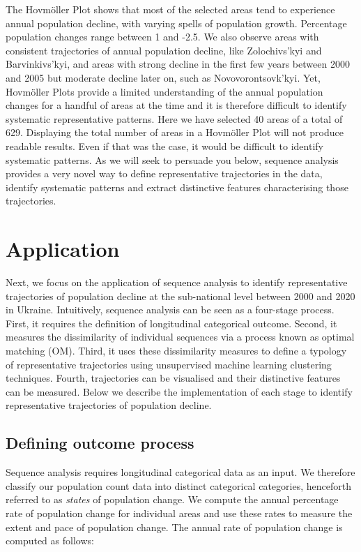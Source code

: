 \documentclass[
  letterpaper,
  DIV=11,
  numbers=noendperiod]{scrreprt}
\begin{document}
The Hovmöller Plot shows that most of the selected areas tend to
experience annual population decline, with varying spells of population
growth. Percentage population changes range between 1 and -2.5. We also
observe areas with consistent trajectories of annual population decline,
like Zolochivs'kyi and Barvinkivs'kyi, and areas with strong decline in
the first few years between 2000 and 2005 but moderate decline later on,
such as Novovorontsovk'kyi. Yet, Hovmöller Plots provide a limited
understanding of the annual population changes for a handful of areas at
the time and it is therefore difficult to identify systematic
representative patterns. Here we have selected 40 areas of a total of
629. Displaying the total number of areas in a Hovmöller Plot will not
produce readable results. Even if that was the case, it would be
difficult to identify systematic patterns. As we will seek to persuade
you below, sequence analysis provides a very novel way to define
representative trajectories in the data, identify systematic patterns
and extract distinctive features characterising those trajectories.

\hypertarget{application}{%
\section{Application}\label{application}}

Next, we focus on the application of sequence analysis to identify
representative trajectories of population decline at the sub-national
level between 2000 and 2020 in Ukraine. Intuitively, sequence analysis
can be seen as a four-stage process. First, it requires the definition
of longitudinal categorical outcome. Second, it measures the
dissimilarity of individual sequences via a process known as optimal
matching (OM). Third, it uses these dissimilarity measures to define a
typology of representative trajectories using unsupervised machine
learning clustering techniques. Fourth, trajectories can be visualised
and their distinctive features can be measured. Below we describe the
implementation of each stage to identify representative trajectories of
population decline.

\hypertarget{defining-outcome-process}{%
\subsection{Defining outcome process}\label{defining-outcome-process}}

Sequence analysis requires longitudinal categorical data as an input. We
therefore classify our population count data into distinct categorical
categories, henceforth referred to as \emph{states} of population
change. We compute the annual percentage rate of population change for
individual areas and use these rates to measure the extent and pace of
population change. The annual rate of population change is computed as
follows:
\end{document}
